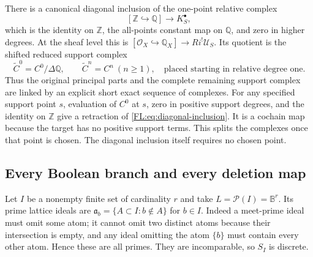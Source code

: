 \documentclass[11pt,a4paper]{article}
\theoremstyle{definition}\newtheorem{definition}[theorem]{Definition}
\providecommand{\RQ}{\mathbb Q}
\begin{document}
There is a canonical diagonal inclusion of the one-point relative
complex
\[
 [\mathbb Z\hookrightarrow\RQ]\longrightarrow K_S^\bullet,
 \tag{FL23}\label{FL:eq:diagonal-inclusion}
\]
which is the identity on $\mathbb Z$, the all-points constant map
on $\RQ$, and zero in higher degrees. At the sheaf level this is
$[\mathcal O_X\hookrightarrow\RQ_X]\to Ri^!\mathcal U_S$.
Its quotient is the shifted reduced support complex
\[
 \widetilde C^0=C^0/\Delta\RQ,\qquad
 \widetilde C^n=C^n\ (n\ge1),
 \quad\text{placed starting in relative degree one}.
 \tag{FL24}\label{FL:eq:reduced-support-complex}
\]
Thus the original principal parts and the complete remaining support
complex are linked by an explicit short exact sequence of complexes.
For any specified support point $s$, evaluation of $C^0$ at $s$,
zero in positive support degrees, and the identity on $\mathbb Z$
give a retraction of \eqref{FL:eq:diagonal-inclusion}. It is a cochain
map because the target has no positive support terms. This splits
the complexes once that point is chosen. The diagonal inclusion
itself requires no chosen point.

\subsection{Every Boolean branch and every deletion map}

Let $I$ be a nonempty finite set of cardinality $r$ and take
$L=\mathcal P(I)=\mathbb B^r$. Its prime lattice ideals are
$\mathfrak a_b=\{A\subset I:b\notin A\}$ for $b\in I$.
Indeed a meet-prime ideal must omit some atom; it cannot omit two
distinct atoms because their intersection is empty, and any ideal
omitting the atom $\{b\}$ must contain every other atom. Hence these
are all primes. They are incomparable, so $S_I$ is discrete.
\end{document}
